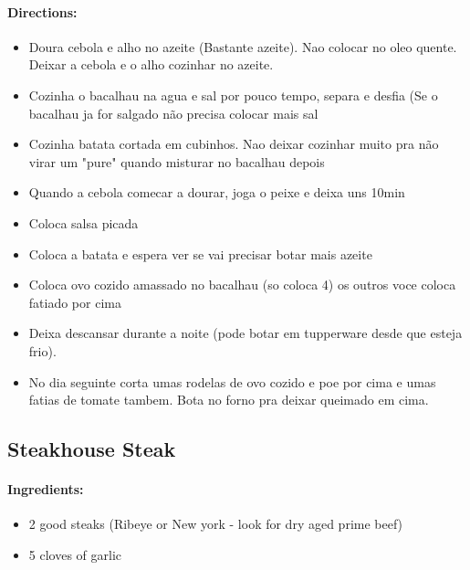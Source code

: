 \documentclass{article}
\begin{document}
\paragraph{Directions:}
\begin{itemize}
	\item Doura cebola e alho no azeite (Bastante azeite). Nao colocar no oleo quente. Deixar a cebola e o alho cozinhar no azeite.
	\item Cozinha o bacalhau na agua e sal por pouco tempo, separa e desfia (Se o bacalhau ja for salgado não precisa colocar mais sal
	\item Cozinha batata cortada em cubinhos. Nao deixar cozinhar muito pra não virar um "pure" quando misturar no bacalhau depois
	\item Quando a cebola comecar a dourar, joga o peixe e deixa uns 10min
	\item Coloca salsa picada
	\item Coloca a batata e espera ver se vai precisar botar mais azeite
	\item Coloca ovo cozido amassado no bacalhau (so coloca 4) os outros voce coloca fatiado por cima
	\item Deixa descansar durante a noite (pode botar em tupperware desde que esteja frio).
	\item No dia seguinte corta umas rodelas de ovo cozido e poe por cima e umas fatias de tomate tambem. Bota no forno pra deixar  queimado em cima.
\end{itemize}

\subsection{Steakhouse Steak}

\paragraph{Ingredients:}

\begin{itemize}
	\item 2 good steaks (Ribeye or New york - look for dry aged prime beef)
	\item 5 cloves of garlic
\end{itemize}
\end{document}
